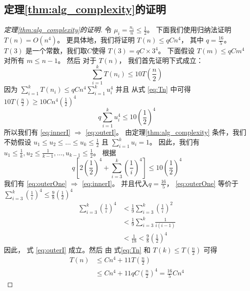 \subsection{定理\ref{thm:alg_complexity}的证明}
\begin{proof}[定理\ref{thm:alg_complexity}的证明]
  令
  $\mu_i = \frac{n_i}{n} \leq \frac{1}{2}$。
  下面我们使用归纳法证明
  $T(n) = O(n^4)$。
  更具体地，我们将证明 
  $T(n) \leq q C n^4$， 其中 $ q = \frac{16}{5}$。
  $T(3)$ 是一个常数，我们取$C$使得 $T(3)= q C\times 3^4$。
  下面假设
	$T(m) \leq qC m^4$
  对所有 $m \leq n-1$。
  然后 对于 $T(n)$，
	我们首先证明下式成立：
	\begin{equation}\label{eq:outerI}
	\sum_{i=1}^k T(n_i) \leq 10 T(\frac{n}{2})
	\end{equation}
	因为 $\sum_{i=1}^k T(n_i) \leq qC n^4\sum_{i=1}^k u_i^4$ 并且
  从式 \eqref{eq:Tn} 中可得
  $10 T(\frac{n}{2}) \geq 10Cn^4 (\frac{1}{2})^4$ 
	\begin{equation}\label{eq:innerI}
       q\sum_{i=1}^k u_i^4 \leq 10 (\frac{1}{2})^4 
	\end{equation}
	所以我们有 \eqref{eq:innerI} $\Rightarrow$ \eqref{eq:outerI}。
  由定理\ref{thm:alg_complexity} 条件，我们不妨假设
  $u_1\leq u_2 \leq \dots \leq u_k \leq \frac{1}{2}$
  且 $\sum_{i=1}^k u_i = 1$。
  因此，我们有
  $u_1 \leq \frac{1}{k}, u_2 \leq \frac{1}{k-1}, \dots, u_{k-1} \leq \frac{1}{2}$。
	根据
  \begin{equation}\label{eq:outerOne}
	 q[2(\frac{1}{2})^4 + \sum_{i=3}^k (\frac{1}{i})^4] \leq 10 (\frac{1}{2})^4
	\end{equation}
	我们有 \eqref{eq:outerOne} $\Rightarrow$ \eqref{eq:innerI}。
  并且代入$q=\frac{16}{5}$，
  \eqref{eq:outerOne} 等价于
	$\sum_{i=3}^k \left(\frac{1}{i} \right)^4 \leq \frac{9}{8}(\frac{1}{2})^4$
	\begin{align*}
		\sum_{i=3}^k (\frac{1}{i})^4 & < \frac{1}{9}\sum_{i=3}^k \left(\frac{1}{i}
    \right)^2 \\
		& < \frac{1}{9}\sum_{i=3}^k \frac{1}{i(i-1)} \\
		& < \frac{1}{18}
    < \frac{9}{8}\left(\frac{1}{2}
    \right)^4
	\end{align*}
	因此，
  式 \eqref{eq:outerI} 成立。然后
  由 式\eqref{eq:Tn} 和 $T(k) \leq T(\frac{n}{2})$ 可得
	\begin{align}
		T(n)  & \leq Cn^4 + 11T\left(\frac{n}{2} \right) \\
		& \leq C n^4 + 11 q C \left(\frac{n}{2}\right)^4
    = \frac{16}{5} C n^4
	\end{align}
\end{proof}

